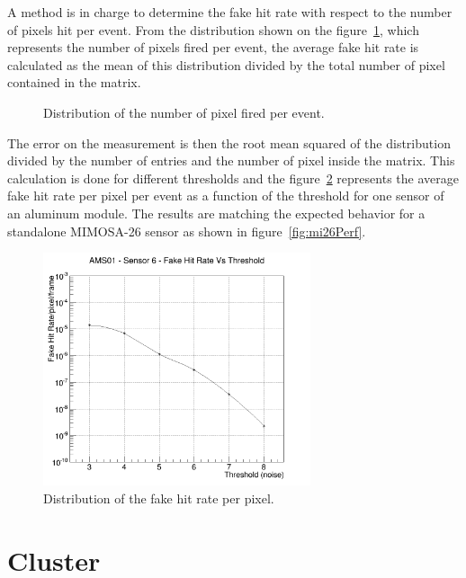   A method is in charge to determine the fake hit rate with respect to the number of pixels hit per event.
  From the distribution shown on the figure~\ref{fig:pixel/event}, which represents the number of pixels fired per event, the average fake hit rate is calculated as the mean of this distribution divided by the total number of pixel contained in the matrix.
    \begin{figure}
    \caption{Distribution of the number of pixel fired per event.}
    \label{fig:pixel/event}
  \end{figure}
  The error on the measurement is then the root mean squared of the distribution divided by the number of entries and the number of pixel inside the matrix.
  This calculation is done for different thresholds and the figure~\ref{fig:FHR} represents the average fake hit rate per pixel per event as a function of the threshold for one sensor of an aluminum module.
  The results are matching the expected behavior for a standalone MIMOSA-26 sensor as shown in figure~\ref{fig:mi26Perf}.

  \begin{figure}
    \centering
    \includegraphics[width=0.7\textwidth]{Pictures/labTests/fake_sensor6.png}
    \caption{Distribution of the fake hit rate per pixel.}
    \label{fig:FHR}
  \end{figure}



\section{Cluster}

  

  \begin{figure}
  \end{figure}
